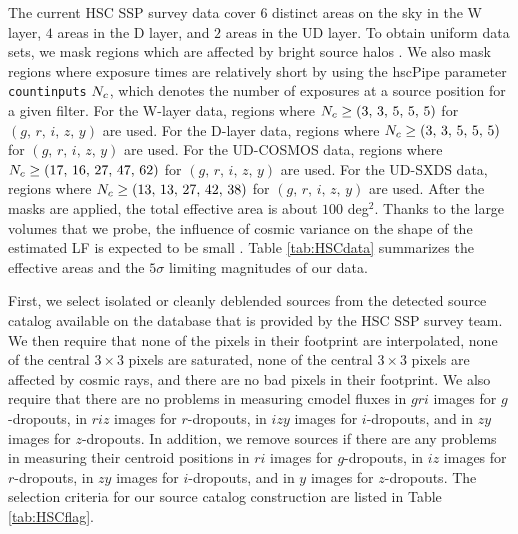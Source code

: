 \documentclass[]{pasj01}
\begin{document}
The current HSC SSP survey data cover 
$6$ distinct areas on the sky in the W layer, 
$4$ areas in the D layer, 
and $2$ areas in the UD layer. 
To obtain uniform data sets, 
we mask regions which are affected by bright source halos \citep{2017arXiv170500622C}.  
We also mask regions where exposure times are relatively short 
by using the hscPipe parameter \verb|countinputs| $N_{\rm c}$, 
which denotes the number of exposures at a source position for a given filter.   
For the W-layer data, regions where $N_{\rm c} \geq (3, \, 3, \, 5, \, 5, \, 5)$ for $(g, \, r, \, i, \, z, \, y)$ are used.  
For the D-layer data, regions where $N_{\rm c} \geq (3, \, 3, \, 5, \, 5, \, 5)$ for $(g, \, r, \, i, \, z, \, y)$ are used.  
For the UD-COSMOS data, regions where $N_{\rm c} \geq (17, \, 16, \, 27, \, 47, \, 62)$ for $(g, \, r, \, i, \, z, \, y)$ are used.   
For the UD-SXDS data, regions where $N_{\rm c} \geq (13, \, 13, \, 27, \, 42, \, 38)$ for $(g, \, r, \, i, \, z, \, y)$ are used.   
After the masks are applied, 
the total effective area is about $100$ deg$^2$. 
Thanks to the large volumes that we probe, 
the influence of cosmic variance on the shape of the estimated LF 
is expected to be small \citep{2008ApJ...676..767T}. 
Table \ref{tab:HSCdata} summarizes 
the effective areas 
and the $5\sigma$ limiting magnitudes of our data. 



First, we select isolated or cleanly deblended sources 
from the detected source catalog 
available on the database \citep{takata2017} 
that is provided by the HSC SSP survey team. 
We then require that 
none of the pixels in their footprint are interpolated, 
none of the central $3 \times 3$ pixels are saturated, 
none of the central $3 \times 3$ pixels are affected by cosmic rays, 
and there are no bad pixels in their footprint.   
We also require that 
there are no problems in measuring cmodel fluxes 
in $gri$ images for $g$-dropouts, 
in $riz$ images for $r$-dropouts, 
in $izy$ images for $i$-dropouts, 
and
in $zy$ images for $z$-dropouts.  
In addition, 
we remove sources 
if there are any problems in measuring their centroid positions 
in $ri$ images for $g$-dropouts, 
in $iz$ images for $r$-dropouts, 
in $zy$ images for $i$-dropouts, 
and 
in $y$ images for $z$-dropouts.  
The selection criteria for our source catalog construction are listed in Table \ref{tab:HSCflag}. 
\end{document}
